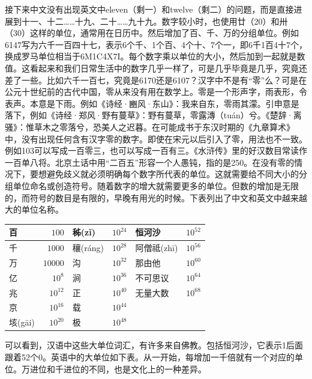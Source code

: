 \documentclass[b5paper]{ctexart}
\begin{document}
接下来中文没有出现英文中eleven（剩一）和twelve（剩二）的问题，而是直接进展到十一、十二……十九、二十……九十九。数字较小时，也使用廿（20）和卅（30）这样的单位，通常用在日历中。然后增加了百、千、万的分组单位。例如6147写为六千一百四十七，表示6个千、1个百、4个十、7个一，即6千1百4十7个，换成罗马单位相当于6M1C4X7I。每个数字乘以单位的大小，然后加到一起就是数值。这看起来和我们日常生活中的数字几乎一样了，可是几乎毕竟是几乎，究竟还差了一些。比如六千一百七，究竟是6170还是6107？汉字中不是有“零”么？可是在公元十世纪前的古代中国，零从来没有用在数学上。零是一个形声字，雨表形，令表声。本意是下雨。例如《诗经·豳风·东山》：我来自东，零雨其濛。引申意是落下，例如《诗经·郑风·野有蔓草》：野有蔓草，零露漙（tu\'{a}n）兮。《楚辞·离骚》：惟草木之零落兮，恐美人之迟暮。在可能成书于东汉时期的《九章算术》中，没有出现任何含有汉字零的数字。即使在宋元以后引入了零，用法也不一致。例如103可以写成一百零三，也可以写成一百有三。《水浒传》里的好汉数目常读作一百单八将。北京土话中用“二百五”形容一个人愚钝，指的是250。在没有零的情况下，要想避免歧义就必须明确每个数字所代表的单位。这就需要给不同大小的分组单位命名或创造符号。随着数字的增大就需要更多的单位。但数的增加是无限的，而符号的数目是有限的，早晚有用光的时候。下表列出了中文和英文中越来越大的单位名称。

\begin{center}
\begin{tabular}{|l|r|l|r|l|r|}
\hline
百            & $100$      & 秭(z\v{i})    & $10^{24}$ &  恒河沙  & $10^{52}$ \\
\hline
千            & $1000$     & 穰(r\'{a}ng)  & $10^{28}$ & 阿僧祗(zh\={i})  & $10^{56}$ \\
\hline
万            & $10000$    & 沟            & $10^{32}$ & 那由他        & $10^{60}$  \\
\hline
亿            & $10^8$     & 涧            & $10^{36}$ &  不可思议      & $10^{64}$ \\
\hline
兆            & $10^{12}$  & 正            & $10^{40}$ &  无量大数      & $10^{68}$ \\
\hline
京            & $10^{16}$  & 载            & $10^{44}$ &               & \\
\hline
垓(g\={a}i)   & $10^{20}$  & 极            & $10^{48}$ &               & \\
\hline
\end{tabular}
\end{center}

可以看到，汉语中这些大单位词汇，有许多来自佛教\cite{Noguchi2007}。包括恒河沙，它表示1后面跟着52个0。英语中的大单位如下表。从一开始，每增加一千倍就有一个对应的单位。万进位和千进位的不同，也是文化上的一种差异。
\end{document}
